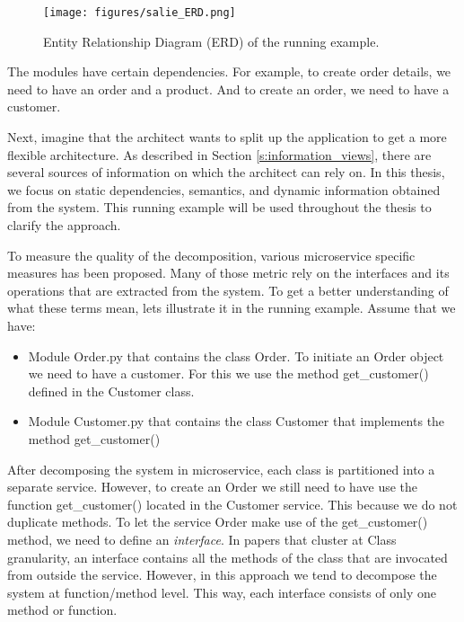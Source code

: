 \begin{figure}
    \centering
    \captionsetup{justification=centering ,margin=1.5cm, labelfont=bf, font=footnotesize}
    \caption{Entity Relationship Diagram (ERD) of the running example.}\label{fig:salie_ERD}
    \texttt{[image: figures/salie\_ERD.png]}
\end{figure}

The modules have certain dependencies. For example, to create order details, we need to have an order and a product. And to create an order, we need to have a customer.\par
Next, imagine that the architect wants to split up the application to get a more flexible architecture. As described in Section \ref{s:information_views}, there are several sources of information on which the architect can rely on. In this thesis, we focus on static dependencies, semantics, and dynamic information obtained from the system. This running example will be used throughout the thesis to clarify the approach.



To measure the quality of the decomposition, various microservice specific measures has been proposed. Many of those metric rely on the interfaces and its operations that are extracted from the system. To get a better understanding of what these terms mean, lets illustrate it in the running example. Assume that we have:

\begin{itemize}
    \item Module Order.py that contains the class Order. To initiate an Order object we need to have a customer. For this we use the method get\_customer() defined in the Customer class.
    \item Module Customer.py that contains the class Customer that implements the method get\_customer()
\end{itemize}

After decomposing the system in microservice, each class is partitioned into a separate service. However, to create an Order we still need to have use the function get\_customer() located in the Customer service. This because we do not duplicate methods. To let the service Order make use of the get\_customer() method, we need to define an \textit{interface}. In papers that cluster at Class granularity, an interface contains all the methods of the class that are invocated from outside the service. However, in this approach we tend to decompose the system at function/method level. This way, each interface consists of only one method or function.

